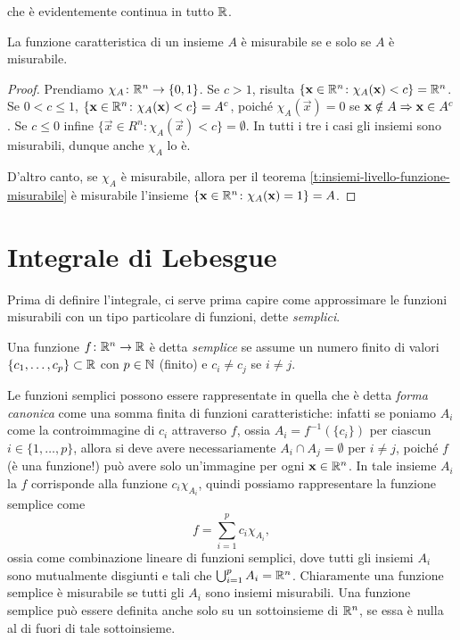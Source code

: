 che è evidentemente continua in tutto $\mathbb{R}$.
\begin{osservazione} \label{o:funzione-caratteristica-misurabile}
	La funzione caratteristica di un insieme $A$ è misurabile se e solo se $A$ è misurabile.
\end{osservazione}
\begin{proof}
	Prendiamo $\chi_A\colon\mathbb{R}^n\to\{0,1\}$.
	Se $c>1$, risulta $\{\mathbf{x}\in \mathbb{R}^n\colon\chi_A(\mathbf{x})<c\}=\mathbb{R}^n$.
	Se $0<c\leq1$, $\{\mathbf{x}\in \mathbb{R}^n\colon \chi_A(\mathbf{x})<c\}={A}^c$, poich\'e $\chi_A(\vec x)=0$ se $\mathbf{x}\notin A\Rightarrow\mathbf{x}\in{A}^c$.
	Se $c\leq 0$ infine $\{\vec x\in R^n\colon \chi_A(\vec x)<c\}=\emptyset$.
	In tutti i tre i casi gli insiemi sono misurabili, dunque anche $\chi_A$ lo è.

	D'altro canto, se $\chi_A$ è misurabile, allora per il teorema \ref{t:insiemi-livello-funzione-misurabile} è misurabile l'insieme $\{\mathbf{x}\in\mathbb{R}^n\colon \chi_A(\mathbf{x})=1\}=A$.
\end{proof}

\section{Integrale di Lebesgue}
Prima di definire l'integrale, ci serve prima capire come approssimare le funzioni misurabili con un tipo particolare di funzioni, dette \emph{semplici}.
\begin{definizione} \label{d:funzione-semplice}
	Una funzione $f\colon\mathbb{R}^n\to\mathbb{R}$ è detta \emph{semplice} se assume un numero finito di valori $\{c_1,\dots,c_p\}\subset\mathbb{R}$ con $p\in\mathbb{N}$ (finito) e $c_i\neq c_j$ se $i\neq j$.
\end{definizione}
Le funzioni semplici possono essere rappresentate in quella che è detta \emph{forma canonica} come una somma finita di funzioni caratteristiche: infatti se poniamo $A_i$ come la controimmagine di $c_i$ attraverso $f$, ossia $A_i=f^{-1}(\{c_i\})$ per ciascun $i\in\{1,\dots,p\}$, allora si deve avere necessariamente $A_i\cap A_j=\emptyset$ per $i\neq j$, poich\'e $f$ (è una funzione!) può avere solo un'immagine per ogni $\mathbf{x}\in\mathbb{R}^n$.
In tale insieme $A_i$ la $f$ corrisponde alla funzione $c_i\chi_{A_i}$, quindi possiamo rappresentare la funzione semplice come
\begin{equation}
	f=\sum_{i=1}^pc_i\chi_{A_i},
	\label{eq:rappresentazione-canonica-funzione-semplice}
\end{equation}
ossia come combinazione lineare di funzioni semplici, dove tutti gli insiemi $A_i$ sono mutualmente disgiunti e tali che $\bigcup_{i=1}^pA_i=\mathbb{R}^n$.
Chiaramente una funzione semplice è misurabile se tutti gli $A_i$ sono insiemi misurabili.
Una funzione semplice può essere definita anche solo su un sottoinsieme di $\mathbb{R}^n$, se essa è nulla al di fuori di tale sottoinsieme.

